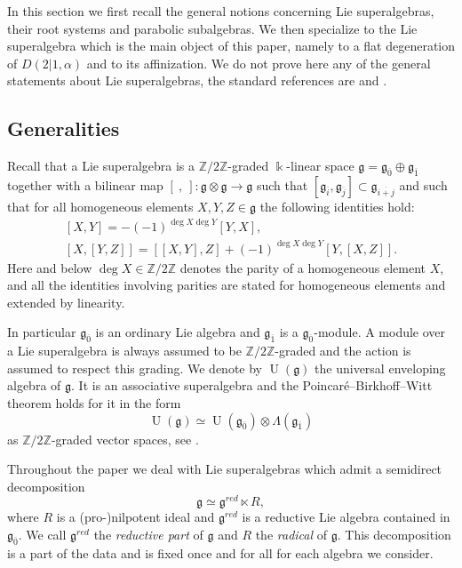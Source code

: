 \documentclass[10pt]{amsart}
\newcommand{\fg}{{\mathfrak g}}
\newcommand{\Dalpha}{D(2|1,\alpha)}
\DeclareMathOperator{\U}{U}
\begin{document}
	In this section we first recall the general notions concerning Lie superalgebras, their root systems and parabolic subalgebras. We then specialize to the Lie superalgebra which is the main object of this paper, namely to a flat degeneration of $\Dalpha$ and to its affinization. We do not prove here any of the general statements about Lie superalgebras, the standard references are \cite{Mus} and \cite{DictionaryOn}.
	
	\subsection{Generalities}
	Recall that a Lie superalgebra is a $\mathbb{Z}/2\mathbb{Z}$-graded $\Bbbk$-linear space $\fg = \fg_{\overline{0}}\oplus\fg_{\overline{1}}$ together with a bilinear map $\left[\ ,\ \right]:\fg\otimes\fg\rightarrow\fg$ such that $\left[\fg_{\overline{i}}, \fg_{\overline{j}}\right]\subset\fg_{\overline{i+j}}$ and such that for all homogeneous elements $X, Y, Z \in \fg$ the following identities hold:
	\begin{align*}
		\left[X,Y\right]=-(-1)^{\deg{X}\deg{Y}}\left[Y,X\right],\\
		\left[X,\left[Y,Z\right]\right]=\left[\left[X,Y\right],Z\right]+(-1)^{\deg{X}\deg{Y}}\left[Y,\left[X,Z\right]\right].
	\end{align*}
	Here and below $\deg X \in \mathbb{Z}/2\mathbb{Z}$ denotes the parity of a homogeneous element $X$, and all the identities involving parities are stated for homogeneous elements and extended by linearity.
	
	In particular $\fg_{\overline 0}$ is an ordinary Lie algebra and $\fg_{\overline 1}$ is a $\fg_{\overline 0}$-module. A module over a Lie superalgebra is always assumed to be $\mathbb{Z}/2\mathbb{Z}$-graded and the action is assumed to respect this grading. We denote by $\U(\fg)$ the universal enveloping algebra of $\fg$. It is an associative superalgebra and the Poincar\'e--Birkhoff--Witt theorem holds for it in the form
	\[\U(\fg)\simeq \U(\fg_{\overline 0})\otimes \Lambda(\fg_{\overline 1})\]
	as $\mathbb{Z}/2\mathbb{Z}$-graded vector spaces, see \cite[Chapter~6]{Mus}.
	
	Throughout the paper we deal with Lie superalgebras which admit a semidirect decomposition
	\begin{equation}\label{eq:ReductivePart}
		\fg \simeq \fg^{red}\ltimes R,
	\end{equation}
	where $R$ is a (pro-)nilpotent ideal and $\fg^{red}$ is a reductive Lie algebra contained in $\fg_{\overline 0}$. We call $\fg^{red}$ the {\it reductive part} of $\fg$ and $R$ the {\it radical} of $\fg$. This decomposition is a part of the data and is fixed once and for all for each algebra we consider.
	
\end{document}
